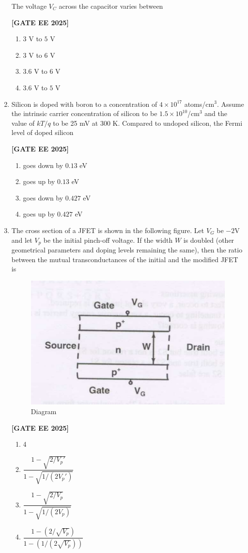 \documentclass[12pt]{article}
\begin{document}
\begin{enumerate}[leftmargin=*, label=\textbf{Q.\arabic*:}]
The voltage $V_C$ across the capacitor varies between
 
\noindent \textbf{[GATE EE 2025]}
\begin{enumerate}
    \item $3$ V to $5$ V
    \item $3$ V to $6$ V
    \item $3.6$ V to $6$ V
    \item $3.6$ V to $5$ V
\end{enumerate}

\item Silicon is doped with boron to a concentration of $4 \times 10^{17}$ atoms/cm$^3$. Assume the intrinsic carrier concentration of silicon to be $1.5\times10^{10}$/cm$^3$ and the value of $kT/q$ to be 25 mV at 300 K. Compared to undoped silicon, the Fermi level of doped silicon
 
\noindent \textbf{[GATE EE 2025]}
\begin{enumerate}
    \item goes down by $0.13$ eV
    \item goes up by $0.13$ eV
    \item goes down by $0.427$ eV
    \item goes up by $0.427$ eV
\end{enumerate}

\item The cross section of a JFET is shown in the following figure. Let $V_G$ be $-2$V and let $V_p$ be the initial pinch-off voltage. If the width $W$ is doubled (other geometrical parameters and doping levels remaining the same), then the ratio between the mutual transconductances of the initial and the modified JFET is

\begin{figure}[H]\centering
\includegraphics[width=0.5\columnwidth]{figs/q52.png}
\caption{Diagram}
\label{fig:q52}
\end{figure}
 
\noindent \textbf{[GATE EE 2025]}
\begin{enumerate}
    \item 4
    \item $\dfrac{1 - \sqrt{2/V_p'}}{1 - \sqrt{1/(2V_p')}}$
    \item $\dfrac{1 - \sqrt{2/V_p}}{1 - \sqrt{1/(2V_p)}}$
    \item $\dfrac{1 - (2/\sqrt{V_p})}{1 - (1/(2\sqrt{V_p}))}$
\end{enumerate}


\end{enumerate}
\end{document}
